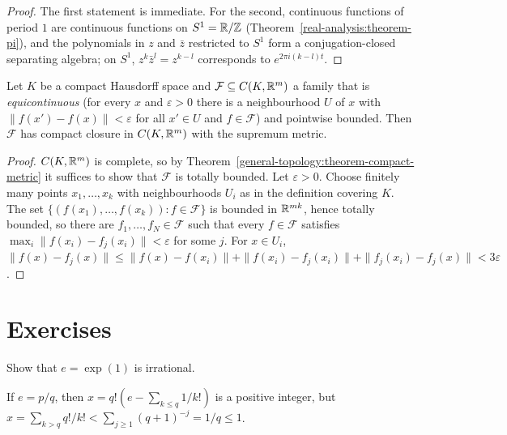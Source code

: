 \begin{proof}
The first statement is immediate. For the second, continuous functions of period $1$ are continuous functions on $S^1 = \mathbb{R}/\mathbb{Z}$ (Theorem~\ref{real-analysis:theorem-pi}), and the polynomials in $z$ and $\bar z$ restricted to
$S^1$ form a conjugation-closed separating algebra; on $S^1$, $z^k\bar z^l = z^{k-l}$ corresponds to $e^{2\pi i(k-l)t}$.
\end{proof}

\begin{theorem}\label{real-analysis:theorem-arzela-ascoli}
Let $K$ be a compact Hausdorff space and $\mathcal{F} \subseteq C(K, \mathbb{R}^m)$ a family that is \emph{equicontinuous} (for every $x$ and $\varepsilon > 0$ there is a neighbourhood $U$ of $x$ with
$\|f(x') - f(x)\| < \varepsilon$ for all $x' \in U$ and $f \in \mathcal{F}$) and pointwise bounded. Then $\mathcal{F}$ has compact closure in $C(K, \mathbb{R}^m)$ with the supremum metric.
\end{theorem}

\begin{proof}
$C(K, \mathbb{R}^m)$ is complete, so by Theorem~\ref{general-topology:theorem-compact-metric} it suffices to show that $\mathcal{F}$ is totally bounded. Let $\varepsilon > 0$. Choose finitely many points $x_1, \ldots, x_k$
with neighbourhoods $U_i$ as in the definition covering $K$. The set $\{(f(x_1), \ldots, f(x_k)) : f \in \mathcal{F}\}$ is bounded in $\mathbb{R}^{mk}$, hence totally bounded, so there are $f_1, \ldots, f_N \in \mathcal{F}$
such that every $f \in \mathcal{F}$ satisfies $\max_i\|f(x_i) - f_j(x_i)\| < \varepsilon$ for some $j$. For $x \in U_i$,
$\|f(x) - f_j(x)\| \leq \|f(x) - f(x_i)\| + \|f(x_i) - f_j(x_i)\| + \|f_j(x_i) - f_j(x)\| < 3\varepsilon$.
\end{proof}

\section{Exercises}\label{real-analysis:section-exercises}

\begin{exercise}\label{real-analysis:exercise-e-irrational}
Show that $e = \exp(1)$ is irrational.
\end{exercise}

\begin{solution}
If $e = p/q$, then $x = q!(e - \sum_{k \leq q}1/k!)$ is a positive integer, but $x = \sum_{k > q}q!/k! < \sum_{j \geq 1}(q + 1)^{-j} = 1/q \leq 1$.
\end{solution}

